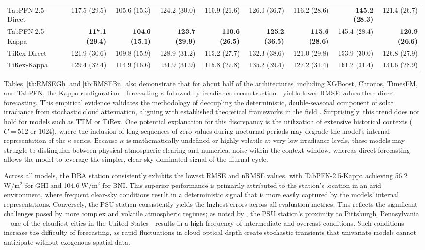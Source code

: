 \documentclass[number, 3p, 10pt, times]{elsarticle}
\begin{document}
\begin{table}[!ht]
\begin{tabular}{lrrrrrrrr}
TabPFN-2.5-Direct & 117.5 (29.5) & 105.6 (15.3) & 124.2 (30.0) & 110.9 (26.6) & 126.0 (36.7) & 116.2 (28.6) & \textbf{145.2 (28.3)} & 121.4 (26.7) \\
TabPFN-2.5-Kappa & \textbf{117.1 (29.4)} & \textbf{104.6 (15.1)} & \textbf{123.7 (29.9)} & \textbf{110.6 (26.5)} & \textbf{125.2 (36.5)} & \textbf{115.6 (28.6)} & 145.4 (28.4) & \textbf{120.9 (26.6)} \\
TiRex-Direct & 121.9 (30.6) & 109.8 (15.9) & 128.9 (31.2) & 115.2 (27.7) & 132.3 (38.6) & 121.0 (29.8) & 153.9 (30.0) & 126.8 (27.9) \\
TiRex-Kappa & 129.4 (32.4) & 114.9 (16.6) & 131.9 (31.9) & 115.8 (27.8) & 135.2 (39.4) & 127.2 (31.4) & 161.2 (31.4) & 131.6 (28.9) \\
\bottomrule
\end{tabular}
\end{table}

Tables~\ref{tb:RMSEGh} and \ref{tb:RMSEBn} also demonstrate that for about half of the architectures, including XGBoost, Chronos, TimesFM, and TabPFN, the Kappa configuration---forecasting $\kappa$ followed by irradiance reconstruction---yields lower RMSE values than direct forecasting. This empirical evidence validates the methodology of decoupling the deterministic, double-seasonal component of solar irradiance from stochastic cloud attenuation, aligning with established theoretical frameworks in the field \citep{YangBook}. Surprisingly, this trend does not hold for models such as TTM or TiRex. One potential explanation for this discrepancy is the utilization of extensive historical contexts ($C=512$ or $1024$), where the inclusion of long sequences of zero values during nocturnal periods may degrade the model's internal representation of the $\kappa$ series. Because $\kappa$ is mathematically undefined or highly volatile at very low irradiance levels, these models may struggle to distinguish between physical atmospheric clearing and numerical noise within the context window, whereas direct forecasting allows the model to leverage the simpler, clear-sky-dominated signal of the diurnal cycle.

Across all models, the DRA station consistently exhibits the lowest RMSE and nRMSE values, with TabPFN-2.5-Kappa achieving 56.2 W/m$^2$ for GHI and 104.6 W/m$^2$ for BNI. This superior performance is primarily attributed to the station's location in an arid environment, where frequent clear-sky conditions result in a deterministic signal that is more easily captured by the models' internal representations. Conversely, the PSU station consistently yields the highest errors across all evaluation metrics. This reflects the significant challenges posed by more complex and volatile atmospheric regimes; as noted by \citet{YANG2022743}, the PSU station's proximity to Pittsburgh, Pennsylvania---one of the cloudiest cities in the United States---results in a high frequency of intermediate and overcast conditions. Such conditions increase the difficulty of forecasting, as rapid fluctuations in cloud optical depth create stochastic transients that univariate models cannot anticipate without exogenous spatial data.
\end{document}
